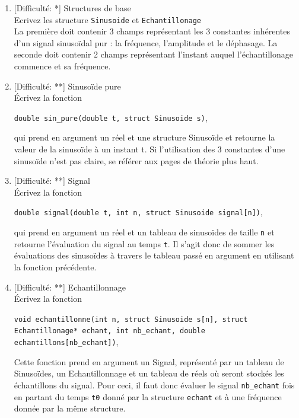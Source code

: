 \documentclass[11pt]{article}
\begin{document}
\begin{enumerate}

\item \textcolor{mygreen}{[Difficulté: *]} Structures de base\\
Ecrivez les structure \texttt{Sinusoide} et \texttt{Echantillonage}\\
La première doit contenir 3 champs représentant les 3 constantes inhérentes d'un signal sinusoïdal pur : la fréquence, l'amplitude et le déphasage. La seconde doit contenir 2 champs représentant l'instant auquel l'échantillonage commence et sa fréquence.

\vspace{20pt}

\item \textcolor{mygreen}{[Difficulté: **]} Sinusoïde pure\\
Écrivez la fonction
\begin{center} 
\texttt{double sin\_pure(double t, struct Sinusoide s)}, 
\end{center}
qui prend en argument un réel et une structure Sinusoïde et retourne la valeur de la sinusoïde à un instant t. Si l'utilisation des 3 constantes d'une sinusoïde n'est pas claire, se référer aux pages de théorie plus haut.

\vspace{20pt}

\item \textcolor{mygreen}{[Difficulté: **]} Signal\\
Écrivez la fonction
\begin{center} 
\texttt{double signal(double t, int n, struct Sinusoide signal[n])}, 
\end{center}
qui prend en argument un réel et un tableau de sinusoïdes de taille \texttt{n} et retourne l'évaluation du signal au temps \texttt{t}. Il s'agit donc de sommer les évaluations des sinusoïdes à travers le tableau passé en argument en utilisant la fonction précédente.

\vspace{20pt}

\item \textcolor{mygreen}{[Difficulté: **]} Echantillonnage\\
Écrivez la fonction
\begin{center} 
\texttt{void echantillonne(int n, struct Sinusoide s[n],  
				   struct Echantillonage* echant,
                   int nb\_echant, double echantillons[nb\_echant])}, 
\end{center}
Cette fonction prend en argument un Signal, représenté par un tableau de Sinusoïdes, un Echantillonnage et un tableau de réels où seront stockés les échantillons du signal. Pour ceci, il faut donc évaluer le signal \texttt{nb\_echant} fois en partant du temps \texttt{t0} donné par la structure \texttt{echant} et à une fréquence donnée par la même structure. 



\end{enumerate}
\end{document}
